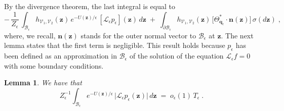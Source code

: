 \documentclass[reqno]{amsart}
\newtheorem{lemma}[theorem]{Lemma}
\newcounter{as}[section]
\newcommand{\mc}[1]{{\mathcal #1}}
\newcommand{\bs}[1]{{\boldsymbol #1}}
\newcommand{\<}{\langle}
\renewcommand{\>}{\rangle}
\begin{document}
By the divergence theorem, the last integral is equal to
\begin{equation}
\label{se50}
-\, \frac 1{Z_{\epsilon}}\, \int_{\mc{B}_{\epsilon}}
h_{\mc{V}_{1},\mc{V}_{2}}(\bs{z}) \, e^{-U(\bs{z})/\epsilon}\,
[\mc{L}_{\epsilon}p_{\epsilon}](\bs{z}) \, d\bs{z}
\;+\; \int_{\partial\mc{B}_{\epsilon}}
h_{\mc{V}_{1},\mc{V}_{2}}(\bs{z}) \,
\big[\Theta_{\bs{q}_{\epsilon}}^{*}\cdot\bs{n}(\bs{z})\big]
\, \sigma(d\bs{z})\;,
\end{equation}
where, we recall, $\bs{n}(\bs{z})$ stands for the outer normal vector
to $\mc B_{\epsilon}$ at $\bs z$. The next lemma states that the first
term is negligible. This result holds because
$p_{\epsilon}$ has been defined as an approximation in $\mc
B_{\epsilon}$ of the solution of the equation $\mc{L}_{\epsilon} f =0$
with some boundary conditions.

\begin{lemma}
\label{pt21}
We have that
\begin{equation*}
Z_{\epsilon}^{-1}\int_{\mc{B}_{\epsilon}} e^{-U(\bs{z})/\epsilon}
\, \big|\mc{L}_{\epsilon} p_{\epsilon}(\bs{z})\big| \, d\bs{z}
\;=\;o_{\epsilon}(1)\,T_\epsilon\;.
\end{equation*}
\end{lemma}
\end{document}
